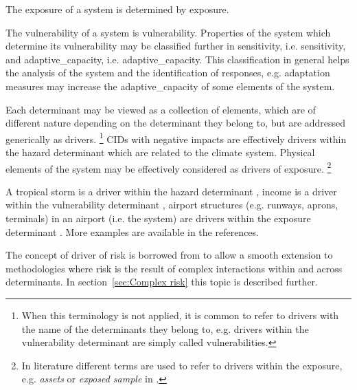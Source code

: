 The \gls{exposure} of a system is determined by \glsdesc{exposure}.

The \gls{vulnerability} of a system is \glsdesc{vulnerability}. Properties of the system which determine its \gls{vulnerability} may be classified further in \gls{sensitivity}, i.e. \glsdesc{sensitivity}, and \gls{adaptive_capacity}, i.e. \glsdesc{adaptive_capacity}. This classification in general helps the analysis of the system and the identification of responses, e.g. \gls{adaptation} measures may increase the \gls{adaptive_capacity} of some elements of the system.

Each \gls{determinant} may be viewed as a collection of elements, which are of different nature depending on the \gls{determinant} they belong to, but are addressed generically as \glspl{driver}.%
\footnote{When this terminology is not applied, it is common to refer to \glspl{driver} with the name of the \glspl{determinant} they belong to, e.g. drivers within the \gls{vulnerability} determinant are simply called vulnerabilities.}
\Glspl{CID} with negative \glspl{impact} are effectively \glspl{driver} within the \gls{hazard} \gls{determinant} which are related to the climate system.
Physical elements of the system may be effectively considered as \glspl{driver} of \gls{exposure}.%
\footnote{In literature different terms are used to refer to \glspl{driver} within the \gls{exposure}, e.g. \emph{assets} or \emph{exposed sample} in \cite{2022DeVivoRiskAssessment}.}
\begin{example}
  A tropical storm is a \gls{driver} within the \gls{hazard} \gls{determinant} \cite[15]{2017GIZRiskSupplement}, income is a \gls{driver} within the \gls{vulnerability} \gls{determinant} \cite[493]{2021SimpsonAFramework}, airport structures (e.g. runways, aprons, terminals) in an airport (i.e. the system) are \glspl{driver} within the \gls{exposure} \gls{determinant} \cite[551]{2022DeVivoRiskAssessment}. More examples are available in the references.
\end{example}
The concept of \gls{driver} of \gls{risk} is borrowed from \cite{2021SimpsonAFramework} to allow a smooth extension to methodologies where \gls{risk} is the result of complex interactions within and across \glspl{determinant}. In section~\ref{sec:Complex risk} this topic is described further.

